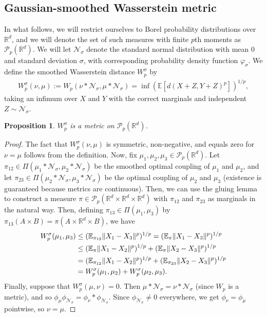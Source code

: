 \documentclass{article}
\newtheorem{proposition}[theorem]{Proposition}
\newcommand{\R}{\mathbb{R}}
\newcommand{\E}{\mathbb{E}}
\newcommand{\N}{\mathcal{N}}
\renewcommand{\P}{\mathcal{P}}
\DeclarePairedDelimiter{\norm}{\lVert}{\rVert}
\begin{document}
\subsection{Gaussian-smoothed Wasserstein metric}

In what follows, we will restrict ourselves to Borel probability distributions over $\R^d$, and we will denote the set of such measures with finite $p$th moments as $\P_p(\R^d)$. We will let $\N_\sigma$ denote the standard normal distribution with mean 0 and standard deviation $\sigma$, with corresponding probability density function $\varphi_\sigma$. We define the smoothed Wasserstein distance $W_p^\sigma$ by
\begin{align*}
    W_p^\sigma(\nu,\mu) := W_p(\nu * \N_\sigma, \mu * \N_\sigma) = \inf (\E[d(X + Z, Y + Z)^p])^{1/p},
\end{align*}
taking an infimum over $X$ and $Y$ with the correct marginals and independent $Z \sim \N_\sigma$.


\begin{proposition}
    $W_p^\sigma$ is a metric on $\P_p(\R^d)$.
\end{proposition}
\begin{proof}
    The fact that $W_p^\sigma(\nu,\mu)$ is symmetric, non-negative, and equals zero for $\nu=\mu$ follows from the definition. Now, fix $\mu_1, \mu_2, \mu_3 \in \P_p(\R^d)$. Let $\pi_{12} \in \Pi(\mu_1 * \N_\sigma, \mu_2 * \N_\sigma)$ be the smoothed optimal coupling of $\mu_1$ and $\mu_2$, and let $\pi_{23} \in \Pi(\mu_2 * \N_\sigma, \mu_3 * \N_\sigma)$ be the optimal coupling of $\mu_2$ and $\mu_3$ (existence is guaranteed because metrics are continuous). Then, we can use the gluing lemma to construct a measure $\pi \in \P_p(\R^d \times \R^d \times \R^d)$ with $\pi_{12}$ and $\pi_{23}$ as marginals in the natural way. Then, defining $\pi_{13} \in \Pi(\mu_1, \mu_3)$ by $\pi_{13}(A \times B) = \pi(A \times \R^d \times B)$, we have
    \begin{align*}
        W_p^\sigma(\mu_1, \mu_3) &\leq (\E_{\pi_{13}}\norm{X_1 - X_3}^p)^{1/p} = (\E_{\pi}\norm{X_1 - X_3}^p)^{1/p}\\
        &\leq (\E_{\pi} \norm{X_1 - X_2}^p)^{1/p} + (\E_{\pi}\norm{X_2 - X_3}^p)^{1/p}\\
        &= (\E_{\pi_{12}} \norm{X_1 - X_2}^p)^{1/p} + (\E_{\pi_{23}}\norm{X_2 - X_3}^p)^{1/p}\\
        &= W_p^\sigma(\mu_1, \mu_2) + W_p^\sigma(\mu_2, \mu_3).
    \end{align*}
    Finally, suppose that $W_p^\sigma(\mu, \nu) = 0$. Then $\mu * \N_\sigma = \nu * \N_\sigma$ (since $W_p$ is a metric), and so $\phi_\mu \phi_{\N_\sigma} = \phi_\nu * \phi_{\N_\sigma}$. Since $\phi_{\N_\sigma} \neq 0$ everywhere, we get $\phi_\nu = \phi_\mu$ pointwise, so $\nu = \mu$.
\end{proof}
\end{document}
